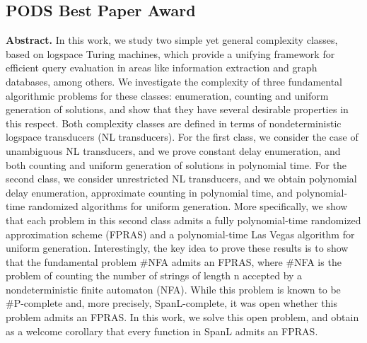 
\clearpage



\subsection*{PODS Best Paper Award}


\vspace{1mm}

\textbf{Abstract.} In this work, we study two simple yet general complexity classes, based on logspace Turing machines, which provide a unifying framework for efficient query evaluation in areas like information extraction and graph databases, among others. We investigate the complexity of three fundamental algorithmic problems for these classes: enumeration, counting and uniform generation of solutions, and show that they have several desirable properties in this respect. Both complexity classes are defined in terms of nondeterministic logspace transducers (NL transducers). For the first class, we consider the case of unambiguous NL transducers, and we prove constant delay enumeration, and both counting and uniform generation of solutions in polynomial time. For the second class, we consider unrestricted NL transducers, and we obtain polynomial delay enumeration, approximate counting in polynomial time, and polynomial-time randomized algorithms for uniform generation. More specifically, we show that each problem in this second class admits a fully polynomial-time randomized approximation scheme (FPRAS) and a polynomial-time Las Vegas algorithm for uniform generation. Interestingly, the key idea to prove these results is to show that the fundamental problem \#NFA admits an FPRAS, where \#NFA is the problem of counting the number of strings of length n accepted by a nondeterministic finite automaton (NFA). While this problem is known to be \#P-complete and, more precisely, SpanL-complete, it was open whether this problem admits an FPRAS. In this work, we solve this open problem, and obtain as a welcome corollary that every function in SpanL admits an FPRAS.

